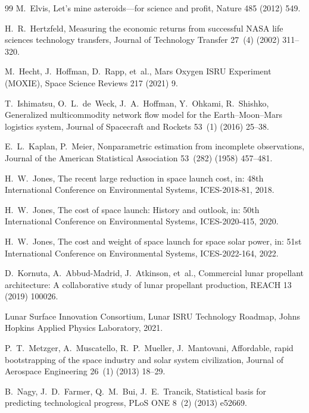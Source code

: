\documentclass[preprint,12pt]{elsarticle}
\begin{document}
\begin{thebibliography}{99}
M.~Elvis,
\newblock Let's mine asteroids---for science and profit,
\newblock Nature 485 (2012) 549.

H.~R.~Hertzfeld,
\newblock Measuring the economic returns from successful NASA life sciences technology transfers,
\newblock Journal of Technology Transfer 27~(4) (2002) 311--320.

M.~Hecht, J.~Hoffman, D.~Rapp, et~al.,
\newblock Mars Oxygen ISRU Experiment (MOXIE),
\newblock Space Science Reviews 217 (2021) 9.

T.~Ishimatsu, O.~L.~de~Weck, J.~A.~Hoffman, Y.~Ohkami, R.~Shishko,
\newblock Generalized multicommodity network flow model for the Earth--Moon--Mars logistics system,
\newblock Journal of Spacecraft and Rockets 53~(1) (2016) 25--38.

E.~L.~Kaplan, P.~Meier,
\newblock Nonparametric estimation from incomplete observations,
\newblock Journal of the American Statistical Association 53~(282) (1958) 457--481.

H.~W.~Jones,
\newblock The recent large reduction in space launch cost,
\newblock in: 48th International Conference on Environmental Systems, ICES-2018-81, 2018.

H.~W.~Jones,
\newblock The cost of space launch: History and outlook,
\newblock in: 50th International Conference on Environmental Systems, ICES-2020-415, 2020.

H.~W.~Jones,
\newblock The cost and weight of space launch for space solar power,
\newblock in: 51st International Conference on Environmental Systems, ICES-2022-164, 2022.

D.~Kornuta, A.~Abbud-Madrid, J.~Atkinson, et~al.,
\newblock Commercial lunar propellant architecture: A collaborative study of lunar propellant production,
\newblock REACH 13 (2019) 100026.

Lunar Surface Innovation Consortium,
\newblock Lunar ISRU Technology Roadmap,
\newblock Johns Hopkins Applied Physics Laboratory, 2021.

P.~T.~Metzger, A.~Muscatello, R.~P.~Mueller, J.~Mantovani,
\newblock Affordable, rapid bootstrapping of the space industry and solar system civilization,
\newblock Journal of Aerospace Engineering 26~(1) (2013) 18--29.

B.~Nagy, J.~D.~Farmer, Q.~M.~Bui, J.~E.~Trancik,
\newblock Statistical basis for predicting technological progress,
\newblock PLoS ONE 8~(2) (2013) e52669.


\end{thebibliography}
\end{document}
